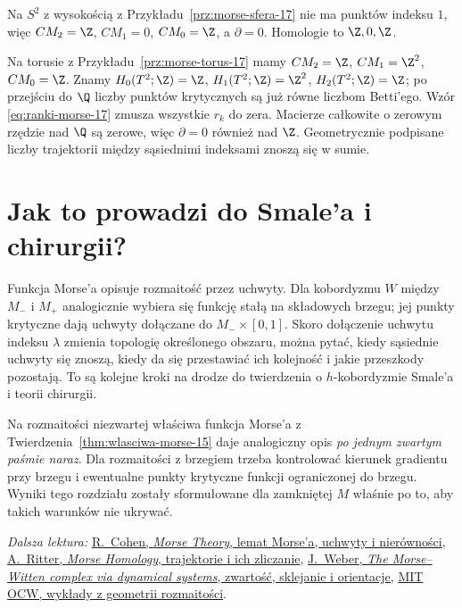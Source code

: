 \begin{przyklad}
Na $S^2$ z wysokością
z Przykładu~\ref{prz:morse-sfera-17}
nie ma punktów indeksu $1$,
więc
$CM_2=\Z$, $CM_1=0$,
$CM_0=\Z$, a $\partial=0$.
Homologie to $\Z,0,\Z$.

Na torusie z
Przykładu~\ref{prz:morse-torus-17}
mamy
$CM_2=\Z$, $CM_1=\Z^2$,
$CM_0=\Z$. Znamy
$H_0(T^2;\Z)=\Z$,
$H_1(T^2;\Z)=\Z^2$,
$H_2(T^2;\Z)=\Z$;
po przejściu do $\Q$
liczby punktów krytycznych
są już równe liczbom
Betti'ego. Wzór
\eqref{eq:ranki-morse-17}
zmusza wszystkie
$r_k$ do zera.
Macierze całkowite
o zerowym rzędzie
nad $\Q$ są zerowe,
więc $\partial=0$
również nad $\Z$.
Geometrycznie podpisane
liczby trajektorii między
sąsiednimi indeksami
znoszą się w sumie.
\end{przyklad}

\section{Jak to prowadzi do Smale'a i chirurgii?}
\label{sec:morse-most-17}

Funkcja Morse'a opisuje rozmaitość
przez uchwyty. Dla kobordyzmu
$W$ między $M_-$ i $M_+$
analogicznie wybiera się funkcję
stałą na składowych brzegu;
jej punkty krytyczne dają
uchwyty dołączane do
$M_-\times[0,1]$.
Skoro dołączenie uchwytu
indeksu $\lambda$ zmienia
topologię określonego
obszaru, można pytać,
kiedy sąsiednie uchwyty
się znoszą, kiedy da
się przestawiać ich
kolejność i jakie
przeszkody pozostają.
To są kolejne kroki
na drodze do twierdzenia
o $h$-kobordyzmie
Smale'a i teorii chirurgii.

Na rozmaitości niezwartej
właściwa funkcja Morse'a
z Twierdzenia~\ref{thm:wlasciwa-morse-15}
daje analogiczny opis
\emph{po jednym zwartym
paśmie naraz}. Dla
rozmaitości z brzegiem
trzeba kontrolować
kierunek gradientu
przy brzegu i ewentualne
punkty krytyczne
funkcji ograniczonej
do brzegu. Wyniki
tego rozdziału zostały
sformułowane dla
zamkniętej $M$ właśnie
po to, aby takich
warunków nie ukrywać.

\par\smallskip
{\footnotesize\noindent\emph{Dalsza lektura:}
\href{https://math.stanford.edu/~ralph/morsecourse/biglectures.pdf}{R.\ Cohen, \emph{Morse Theory}, lemat Morse'a, uchwyty i nierówności},
\href{https://people.maths.ox.ac.uk/ritter/morse-cambridge/full.pdf}{A.\ Ritter, \emph{Morse Homology}, trajektorie i ich zliczanie},
\href{https://arxiv.org/pdf/math/0411465}{J.\ Weber, \emph{The Morse--Witten complex via dynamical systems}, zwartość, sklejanie i orientacje},
\href{https://ocw.mit.edu/courses/18-965-geometry-of-manifolds-fall-2004/pages/lecture-notes/}{MIT OCW, wykłady z geometrii rozmaitości}.\par}
